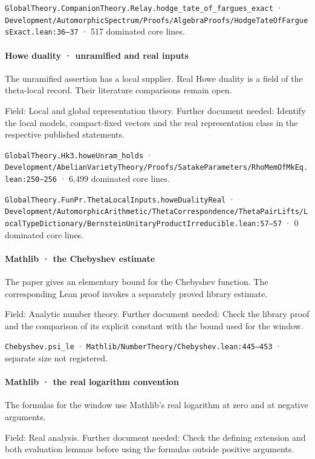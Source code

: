 \nolinkurl{GlobalTheory.CompanionTheory.Relay.hodge_tate_of_fargues_exact} · \nolinkurl{Development/AutomorphicSpectrum/Proofs/AlgebraProofs/HodgeTateOfFarguesExact.lean:36–37} · 517 dominated core lines.

\paragraph{Howe duality · unramified and real inputs}

The unramified assertion has a local supplier. Real Howe duality is a field of the theta-local record. Their literature comparisons remain open.

Field: Local and global representation theory. Further document needed: Identify the local models, compact-fixed vectors and the real representation class in the respective published statements.

\nolinkurl{GlobalTheory.Hk3.howeUnram_holds} · \nolinkurl{Development/AbelianVarietyTheory/Proofs/SatakeParameters/RhoMemOfMkEq.lean:250–256} · 6,499 dominated core lines.

\nolinkurl{GlobalTheory.FunPr.ThetaLocalInputs.howeDualityReal} · \nolinkurl{Development/AutomorphicArithmetic/ThetaCorrespondence/ThetaPairLifts/LocalTypeDictionary/BernsteinUnitaryProductIrreducible.lean:57–57} · 0 dominated core lines.

\paragraph{Mathlib · the Chebyshev estimate}

The paper gives an elementary bound for the Chebyshev function. The corresponding Lean proof invokes a separately proved library estimate.

Field: Analytic number theory. Further document needed: Check the library proof and the comparison of its explicit constant with the bound used for the window.

\nolinkurl{Chebyshev.psi_le} · \nolinkurl{Mathlib/NumberTheory/Chebyshev.lean:445–453} · separate size not registered.

\paragraph{Mathlib · the real logarithm convention}

The formulas for the window use Mathlib’s real logarithm at zero and at negative arguments.

Field: Real analysis. Further document needed: Check the defining extension and both evaluation lemmas before using the formulas outside positive arguments.

